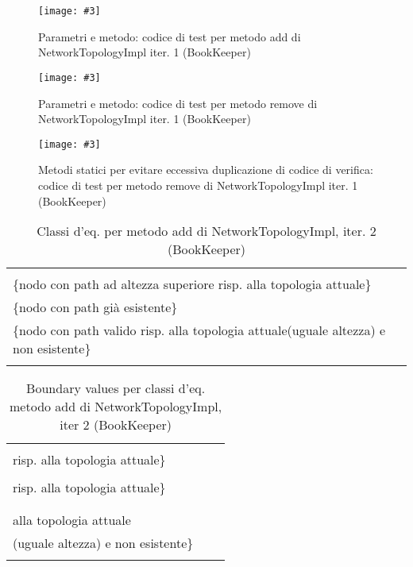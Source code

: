 \documentclass[10pt, a4paper]{article}
\newcommand{\Intmaketable}[4]{
	\begin{longtable}{#3}
	#4
	\caption{#2}
	\label{#1}
	\end{longtable}
}
\newcommand{\Intceqtable}[3]{
	\Intmaketable{#1}{#2}{|l|l|}{
	\hline
	\thead{Parametro formale} & \thead{Classi d'equivalenza} \\
	\hline
	\hline
	#3
	\hline}
}
\newcommand{\Intbvtable}[3]{
	\Intmaketable{#1}{#2}{|l|l|l|}{
	\hline
	\thead{Parametro formale} & \thead{Classe d'equivalenza} & \thead{Boundary value}\\
	\hline
	\hline
	#3
	\hline}
}
\newcommand{\Intceqcaption}[4]{Classi d'eq. per metodo #1 di #2, iter. #3 (#4)}
\newcommand{\Intbvcaption}[4]{Boundary values per classi d'eq. metodo #1 di #2, iter #3 (#4)}
\newcommand{\gettablelabel}[5]{table:#1:#2:#3:iter#4:proj#5}
\newcommand{\ceqtable}[5]{
	\Intceqtable{\gettablelabel{ceq}{#1}{#2}{#3}{#4}}
		{\Intceqcaption{#1}{#2}{#3}{#4}}
		{#5}
}
\newcommand{\bvtable}[5]{
	\Intbvtable{\gettablelabel{bv}{#1}{#2}{#3}{#4}}
		{\Intbvcaption{#1}{#2}{#3}{#4}}
		{#5}
}
\newcommand{\getpicturelabel}[1]{picture:#1}
\newcommand{\makepicture}[4]{
	\begin{figure}[H]
	\centering
	\texttt{[image: \#3]}
	\caption{#4}
	\label{\getpicturelabel{#3}}
	\end{figure}
}
\newcommand{\finishcodecaption}[4]{codice di test per metodo #1 di #2 iter. #3 (#4)}
\newcommand{\tcell}{\makecell[tl]}
\newcommand{\newtrow}{\\ \hline}
\def\bookkeeper{BookKeeper}
\newcommand{\ceq}[1]{\{#1\}}
\begin{document}
	\makepicture{17cm}{16cm}{bk/code-1-add-NetworkTopologyImpl-1}
				{Parametri e metodo: \finishcodecaption{add}{NetworkTopologyImpl}{1}{\bookkeeper}}
				
	\makepicture{16cm}{10cm}{bk/code-1-remove-NetworkTopologyImpl-1}
				{Parametri e metodo: \finishcodecaption{remove}{NetworkTopologyImpl}{1}{\bookkeeper}}
				
	\makepicture{16cm}{12cm}{bk/code-2-remove-NetworkTopologyImpl-1}
				{Metodi statici per evitare eccessiva duplicazione di codice di verifica:
				\finishcodecaption{remove}{NetworkTopologyImpl}{1}{\bookkeeper}}
				
	
	\ceqtable{add}{NetworkTopologyImpl}{2}{\bookkeeper}{
			\tcell{node} & \tcell{
									\ceq{nodo con path ad altezza inferiore risp. alla topologia attuale} \\
									\ceq{nodo con path ad altezza superiore risp. alla topologia attuale} \\
									\ceq{nodo con path già esistente} \\
									\ceq{nodo con path valido risp. alla topologia attuale(uguale altezza) e non esistente}
								}
		\newtrow
	}
	
	\bvtable{add}{NetworkTopologyImpl}{2}{\bookkeeper}{
			\tcell{node} & 
			\tcell{\ceq{nodo con path ad altezza inferiore\\ risp. alla topologia attuale}} &
			\tcell{Node("/rack-1/bookie-1")}
		\newtrow
			\tcell{node} &
			\tcell{\ceq{nodo con path ad altezza superiore\\ risp. alla topologia attuale}} &
			\tcell{Node("/region-1/dc-1/rack-1/bookie-1")}
		\newtrow
			\tcell{node} &
			\tcell{\ceq{nodo con path già esistente}} &
			\tcell{Node("/dc-1/rack-1/bookie-1")}
		\newtrow
			\tcell{node} &
			\tcell{\ceq{nodo con path valido risp.\\ alla topologia attuale\\(uguale altezza) e non esistente}} &
			\tcell{Node("/dc-3/rack-4/bookie-7")}
		\newtrow
	}
	
\end{document}
